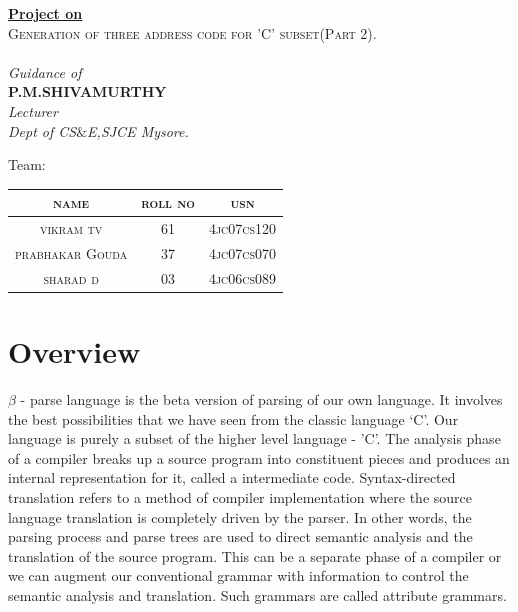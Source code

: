 \documentclass[12pt, oneside, a4paper]{article}
\begin{document}
\begin{center}
\textbf{\underline{Project on}}\\
\textsc{Generation of three address code for 'C' subset(Part 2).\\}
\emph{\\Guidance of}\\
\textbf{P.M.SHIVAMURTHY}\\
\textit{Lecturer}\\
\textit{Dept of CS$\&$E,SJCE Mysore.}\\
\end{center}
Team:
\begin{center}
\begin{tabular}{|c|c|c|}
\hline
\textsc{name}
&\textsc{roll no}
&\textsc{usn}
\\\hline
\textsc{vikram tv}
&61
&\textsc{4jc07cs120}
\\\hline
\textsc{prabhakar Gouda}
&37
&\textsc{4jc07cs070}
\\\hline
\textsc{sharad d}
&03
&\textsc{4jc06cs089}
\\\hline
\end{tabular}
\end{center}
\newpage
\thispagestyle{empty}
\tableofcontents
\newpage
{}

\section{Overview}

$\beta$ - parse language is the beta version of parsing of our own language.  It involves the best possibilities that we have seen from the classic language `C'.  Our language is purely a subset of the higher level language - 'C'.  The analysis phase of a compiler breaks up a source program into constituent pieces and produces an internal representation for it, called a intermediate code. Syntax-directed translation refers to a method of compiler implementation where the source language translation is completely driven by the parser. In other words, the parsing process and parse trees are used to direct semantic analysis and the translation of the source program. This can be a separate phase of a compiler or we can augment our conventional grammar with information to control the semantic analysis and translation. Such grammars are called attribute grammars.\\
\end{document}
